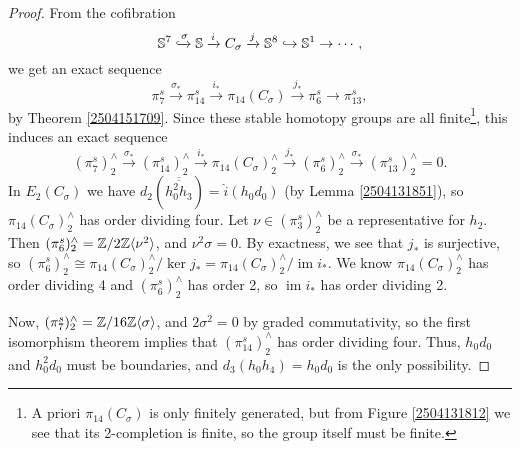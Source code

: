 \documentclass[11pt, titlepage]{article} %
\def\bb{\ensuremath\mathbb}
\def\subq{\ensuremath\subseteq}
\def\inj{\ensuremath\hookrightarrow}
\def\xinj{\ensuremath\xhookrightarrow}
\def\inte{\ensuremath\mathbb{Z}}
\DeclareMathOperator{\im}{im}
\numberwithin{equation}{subsection}
\theoremstyle{plain}
\theoremstyle{definition}
\begin{document}
\begin{proof}
From the cofibration 
\[\bb{S}^7 \xinj{\sigma} \bb{S} \xrightarrow{i}C_\sigma \xrightarrow{j}\bb{S}^8 \inj \bb{S}^1 \to\cdots,\]
we get an exact sequence
\[\pi_{7}^s \xrightarrow{\sigma_*} \pi_{14}^s \xrightarrow{i_*} \pi_{14}(C_\sigma) \xrightarrow{j_*} \pi_6^s \to \pi_{13}^s,\]
by Theorem \ref{2504151709}. Since these stable homotopy groups are all finite\footnote{A priori \(\pi_{14}(C_\sigma)\) is only finitely generated, but from Figure \ref{2504131812} we see that its 2-completion is finite, so the group itself must be finite.}, this induces an exact sequence %
\[(\pi_{7}^s)^\wedge_2 \xrightarrow{\sigma_*} (\pi_{14}^s)^\wedge_2 \xrightarrow{i_*} \pi_{14}(C_\sigma)^\wedge_2 \xrightarrow{j_*} (\pi_6^s)^\wedge_2 \xrightarrow{\sigma_*} (\pi_{13}^s)^\wedge_2=0.\]
In \(E_2(C_\sigma)\) we have \(d_2(\overline{\overline{h_0^2h_3}})=\hat i(h_0d_0)\) (by Lemma \ref{2504131851}), so \(\pi_{14}(C_\sigma)^\wedge_2\) has order dividing four. Let \(\nu \in (\pi_3^s)^\wedge_2\) be a representative for \(h_2\). Then \((\pi_6^s)^\wedge_2=\inte/2\inte \ang{\nu^2}\), and \(\nu^2 \sigma=0\). By exactness, we see that \(j_*\) is surjective, so \((\pi_6^s)^\wedge_2\cong \pi_{14}(C_\sigma)^\wedge_2/\ker j_*=\pi_{14}(C_\sigma)^\wedge_2/\im i_*\). We know \(\pi_{14}(C_\sigma)^\wedge_2\) has order dividing 4 and \((\pi_6^s)^\wedge_2\) has order 2, so \(\im i_*\) has order dividing 2. 

Now, \((\pi_7^s)^\wedge_2=\inte/16\inte \ang{\sigma}\), and \(2 \sigma^2=0\) by graded commutativity, so the first isomorphism theorem implies that \((\pi_{14}^s)^\wedge_2\) has order dividing four. Thus, \(h_0d_0\) and \(h_0^2d_0\) must be boundaries, and \(d_3(h_0h_4)=h_0d_0\) is the only possibility.
\end{proof}


\end{document}
